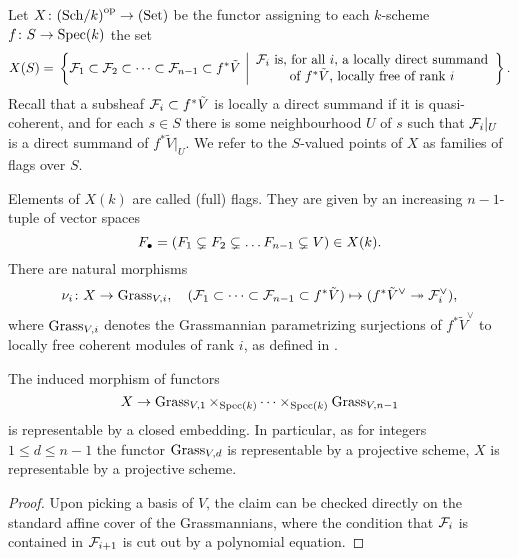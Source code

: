 \documentclass[../main.tex]{subfiles}
\begin{document}
\begin{defi}\label{def:FlagVariety}
  Let $X\colon  {(\mathrm{Sch}/{k})}^{\mathrm{op}} \to {(\mathrm{Set})}$ be the functor assigning to each $k$-scheme 
  $f\colon S \to \operatorname{Spec}(k)$
  the set 
  \begin{equation*}
    X(S) = \\ \left\{\cF_1 \subset \cF_2 \subset \dots \subset \cF_{n-1} \subset
      f^* \tilde V \ \bigg \vert  \begin{array}c
      \text{$\cF_i$ is, for all $i$, a locally direct summand} \\
      \text{of $f^*\tilde V$, locally free of rank $i$}
  \end{array} \right\}.
  \end{equation*}
  Recall that a subsheaf $\mathcal{F}_i \subset f^* \tilde V$ is
  locally a direct summand
  if it is quasi-coherent, and for each $s \in S$ there is some neighbourhood 
  $U$ of $s$ such that $\mathcal{F}_i|_U$ is a direct summand of $f^* \tilde V|_U$. 
  We refer to the $S$-valued points of $X$ as families of flags over $S$.
\end{defi}
Elements of $X(k)$ are called (full) flags. They are given by an increasing
$n-1$-tuple of vector spaces 
$$F_\bullet = (F_1 \subsetneq F_2 \subsetneq \dots F_{n-1} \subsetneq V) \in X(k).$$
  There are natural morphisms
  \begin{equation*}
    \nu_i\colon X \to \operatorname{Grass}_{V,i}, \quad (\mathcal{F}_1 \subset \dots \subset \mathcal{F}_{n-1}
    \subset f^* \tilde V) \mapsto (f^* \tilde V^\vee \twoheadrightarrow \mathcal{F}_i^\vee),
  \end{equation*}
  where $\operatorname{Grass}_{V,i}$ denotes the Grassmannian parametrizing surjections of
  $f^*\tilde V^\vee$ to locally free coherent modules of rank $i$, as defined
  in \cite[ 8]{gortz2020algebraic}.

\begin{prop}\label{prop:FlagVarisProjective}
  The induced morphism of functors
  \begin{equation*}
    X \to \operatorname{Grass}_{V,1} \times_{\operatorname{Spec}(k)} \dots \times_{\operatorname{Spec}(k)}
    \operatorname{Grass}_{V,n-1}
  \end{equation*}
  is representable by a closed embedding. In particular, as for integers $1 \leq d \leq n-1$
  the functor $\operatorname{Grass}_{V,d}$ is representable by a projective scheme, 
  $X$ is representable by a projective scheme. 
\begin{proof}
  Upon picking a basis of $V$, the claim can be checked directly on the
  standard affine cover of the Grassmannians, where the condition that $\mathcal{F}_i$ is
  contained in $\mathcal{F}_{i+1}$ is cut out by a polynomial equation.
\end{proof}
\end{prop}
\end{document}
